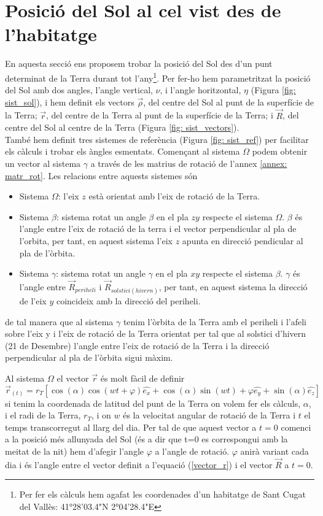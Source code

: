 \documentclass[11pt]{article}
\begin{document}
\section{Posició del Sol al cel vist des de l'habitatge} \label{sec: seccio_2}
En aquesta secció ens proposem trobar la posició del Sol des d'un punt determinat de la Terra durant tot l'any\footnote{\label{nota: habitatge}Per fer els càlculs hem agafat les coordenades d'un habitatge de Sant Cugat del Vallès: 41°28'03.4"N 2°04'28.4"E}. Per fer-ho hem parametritzat la posició del Sol amb dos angles, l'angle vertical, $\nu$, i l'angle horitzontal, $\eta$ (Figura \ref{fig: sist_sol}), i hem definit els vectors $\vec{\rho}$, del centre del Sol al punt de la superfície de la Terra; $\vec{r}$, del centre de la Terra al punt de la superfície de la Terra; i $\vec{R}$, del centre del Sol al centre de la Terra (Figura \ref{fig: sist_vectors}).\\
També hem definit tres sistemes de referència (Figura \ref{fig: sist_ref}) per facilitar els càlculs i trobar els àngles esmentats. Començant al sistema $\Omega$ podem obtenir un vector al sistema $\gamma$ a través de les matrius de rotació de l'annex \ref{annex: matr_rot}. Les relacions entre aquests sistemes són
\begin{itemize}
    \item Sistema $\Omega$: l'eix $z$ està orientat amb l'eix de rotació de la Terra.
    \item Sistema $\beta$: sistema rotat un angle $\beta$ en el pla $zy$ respecte el sistema $\Omega$. $\beta$ és l'angle entre l'eix de rotació de la terra i el vector perpendicular al pla de l'orbita, per tant, en aquest sistema l'eix $z$ apunta en direcció pendicular al pla de l'òrbita.
    \item Sistema $\gamma$: sistema rotat un angle $\gamma$ en el pla $xy$ respecte el sistema $\beta$. $\gamma$ és l'angle entre $\vec{R}_{periheli}$ i $\vec{R}_{solstici(hivern)}$, per tant, en aquest sistema la direcció de l'eix $y$ coincideix amb la direcció del periheli.
\end{itemize}
de tal manera que al sistema $\gamma$ tenim l'òrbita de la Terra amb el periheli i l'afeli sobre l'eix y i l'eix de rotació de la Terra orientat per tal que al solstici d'hivern (21 de Desembre) l'angle entre l'eix de rotació de la Terra i la direcció perpendicular al pla de l'òrbita sigui màxim.

Al sistema $\Omega$ el vector $\vec{r}$ és molt fàcil de definir 
\begin{equation}
    \vec{r}_{(t)}=r_T[\cos(\alpha)\cos(wt+\varphi)\hat{e_x}+\cos(\alpha)\sin(wt)+\varphi\hat{e_y}+\sin(\alpha)\hat{e_z}]
    \label{vector_r}
\end{equation}
si tenim la coordenada de latitud del punt de la Terra on volem fer els càlculs, $\alpha$, i el radi de la Terra, $r_T$, i on $w$ és la velocitat angular de rotació de la Terra i $t$ el temps transcorregut al llarg del dia.
Per tal de que aquest vector a $t=0$ comenci a la posició més allunyada del Sol (és a dir que t=0 es correspongui amb la meitat de la nit) hem d'afegir l'angle $\varphi$ a l'angle de rotació. $\varphi$ anirà variant cada dia i és l'angle entre el vector definit a l'equació (\ref{vector_r}) i el vector $\vec{R}$ a $t=0$.
\end{document}
